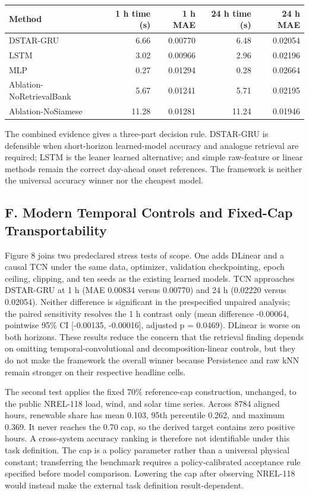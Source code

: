 \documentclass[
  10pt,
  a4paper,
]{article}
\begin{document}
\begin{longtable}[]{@{}lrrrr@{}}
\toprule\noalign{}
Method & 1 h time (s) & 1 h MAE & 24 h time (s) & 24 h MAE \\
\midrule\noalign{}
\endhead
\bottomrule\noalign{}
\endlastfoot
DSTAR-GRU & 6.66 & 0.00770 & 6.48 & 0.02054 \\
LSTM & 3.02 & 0.00966 & 2.96 & 0.02196 \\
MLP & 0.27 & 0.01294 & 0.28 & 0.02664 \\
Ablation-NoRetrievalBank & 5.67 & 0.01241 & 5.71 & 0.02195 \\
Ablation-NoSiamese & 11.28 & 0.01281 & 11.24 & 0.01946 \\
\end{longtable}

The combined evidence gives a three-part decision rule. DSTAR-GRU is
defensible when short-horizon learned-model accuracy and analogue
retrieval are required; LSTM is the leaner learned alternative; and
simple raw-feature or linear methods remain the correct day-ahead onset
references. The framework is neither the universal accuracy winner nor
the cheapest model.

\subsection{F. Modern Temporal Controls and Fixed-Cap
Transportability}\label{f.-modern-temporal-controls-and-fixed-cap-transportability}

Figure 8 joins two predeclared stress tests of scope. One adds DLinear
and a causal TCN under the same data, optimizer, validation
checkpointing, epoch ceiling, clipping, and ten seeds as the existing
learned models. TCN approaches DSTAR-GRU at 1 h (MAE 0.00834 versus
0.00770) and 24 h (0.02220 versus 0.02054). Neither difference is
significant in the prespecified unpaired analysis; the paired
sensitivity resolves the 1 h contrast only (mean difference -0.00064,
pointwise 95\% CI {[}-0.00135, -0.00016{]}, adjusted p = 0.0469).
DLinear is worse on both horizons. These results reduce the concern that
the retrieval finding depends on omitting temporal-convolutional and
decomposition-linear controls, but they do not make the framework the
overall winner because Persistence and raw kNN remain stronger on their
respective headline cells.

The second test applies the fixed 70\% reference-cap construction,
unchanged, to the public NREL-118 load, wind, and solar time series.
Across 8784 aligned hours, renewable share has mean 0.103, 95th
percentile 0.262, and maximum 0.369. It never reaches the 0.70 cap, so
the derived target contains zero positive hours. A cross-system accuracy
ranking is therefore not identifiable under this task definition. The
cap is a policy parameter rather than a universal physical constant;
transferring the benchmark requires a policy-calibrated acceptance rule
specified before model comparison. Lowering the cap after observing
NREL-118 would instead make the external task definition
result-dependent.
\end{document}
